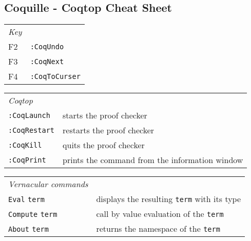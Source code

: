 \subsection{Coquille - Coqtop Cheat Sheet}

\begin{table}[h]
		\begin{left}
			\begin{tabular}{l|l}
			  \emph{Key}\\ 		
		      F2      & \lstinline!:CoqUndo! \\ 	     	                                                   
		      F3      & \lstinline!:CoqNext! \\         
		      F4      & \lstinline!:CoqToCurser!  
		    \end{tabular}
		\end{left}
		\label{tab:coquilleCheatSheetKeys}
	\end{table}		    
\begin{table}[h]
		\begin{left}		    	
		    \begin{tabular}{l|l}
		    \emph{Coqtop}\\
		    \lstinline!:CoqLaunch!  &   starts the proof checker\\   
		    \lstinline!:CoqRestart! &   restarts the proof checker \\       
		    \lstinline!:CoqKill!    &   quits the proof checker \\        
		    \lstinline!:CoqPrint!   &   prints the command from the information window \\
		    \end{tabular}
		    \label{tab:coquilleCheatSheetCoqTop}
		\end{left} 
	\end{table}	
			    
\begin{table}[h]
   \begin{left}		     	  
     	     \begin{tabular}{l|l}
     	     
     	     \emph{Vernacular commands}\\
		          \lstinline!Eval!  \texttt{term}     & displays the resulting \texttt{term} with its type  \\  
		          \lstinline!Compute! \texttt{term}   & call by value evaluation of the \texttt{term} \\          	          
		          \lstinline!About! \texttt{term}     & returns the namespace of the \texttt{term}
	   		\end{tabular}
	   			\label{tab:coquilleCheatSheetVernacular}
		\end{left} 
	\end{table}		  


